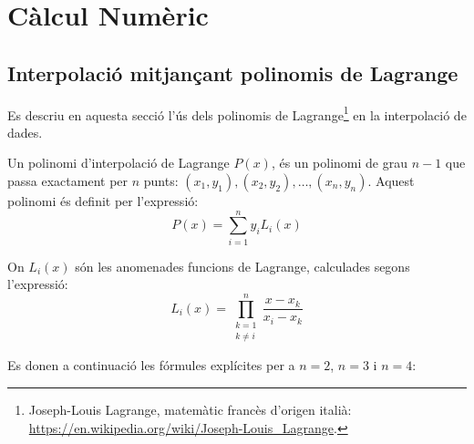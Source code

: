 
\chapter{Càlcul Numèric}\label{sec:ch-calc-num}

\section{Interpolació mitjançant polinomis de Lagrange}
\label{sec:poli_lagr}

Es descriu en aquesta secció l'ús dels polinomis de Lagrange\footnote{Joseph-Louis Lagrange, matemàtic francès d'origen italià: \href{https://en.wikipedia.org/wiki/Joseph-Louis_Lagrange}{https:/\!\!/en.wikipedia.org/wiki/Joseph-Louis\_Lagrange}.}  en la interpolació de dades.

Un polinomi d'interpolació de Lagrange $P(x)$, és un polinomi de grau $n-1$ que passa exactament per $n$ punts:
$(x_1, y_1), (x_2, y_2), \dots, (x_n, y_n)$. Aquest polinomi és definit per l'expressió:
\begin{equation}
  P(x) = \sum_{i=1}^{n}  y_i L_i(x) \label{eq:poly_lag_1}
\end{equation}

On $L_i(x)$ són les anomenades funcions de Lagrange, calculades segons l'expressió:
\begin{equation}
  L_i(x) = \prod_{\substack{k=1 \\ k\neq i}}^{n} \frac{x-x_k}{x_i-x_k} \label{eq:poly_lag_2}
\end{equation}

Es donen a continuació les fórmules explícites per a $n = 2$, $n=3$ i $n=4$:

